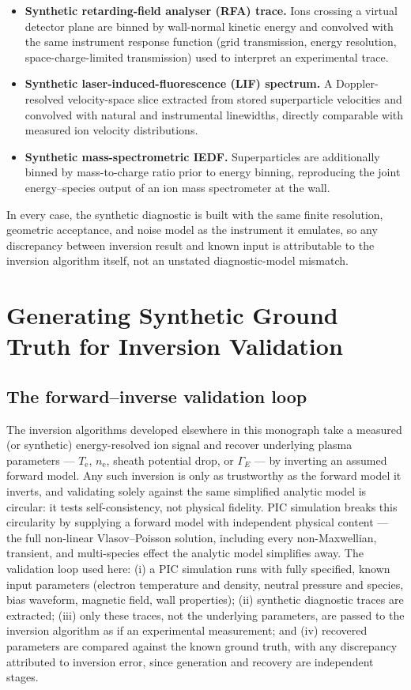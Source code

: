 \begin{itemize}
\item \textbf{Synthetic retarding-field analyser (RFA) trace.} Ions crossing a virtual detector plane are binned by wall-normal kinetic energy and convolved with the same instrument response function (grid transmission, energy resolution, space-charge-limited transmission) used to interpret an experimental trace.
\item \textbf{Synthetic laser-induced-fluorescence (LIF) spectrum.} A Doppler-resolved velocity-space slice extracted from stored superparticle velocities and convolved with natural and instrumental linewidths, directly comparable with measured ion velocity distributions.
\item \textbf{Synthetic mass-spectrometric IEDF.} Superparticles are additionally binned by mass-to-charge ratio prior to energy binning, reproducing the joint energy--species output of an ion mass spectrometer at the wall.
\end{itemize}
In every case, the synthetic diagnostic is built with the same finite resolution, geometric acceptance, and noise model as the instrument it emulates, so any discrepancy between inversion result and known input is attributable to the inversion algorithm itself, not an unstated diagnostic-model mismatch.

\section{Generating Synthetic Ground Truth for Inversion Validation}
\label{sec:synthetic_ground_truth}

\subsection{The forward--inverse validation loop}

The inversion algorithms developed elsewhere in this monograph take a measured (or synthetic) energy-resolved ion signal and recover underlying plasma parameters --- $T_{\mathrm{e}}$, $n_{\mathrm{e}}$, sheath potential drop, or $\Gamma_{E}$ --- by inverting an assumed forward model. Any such inversion is only as trustworthy as the forward model it inverts, and validating solely against the same simplified analytic model is circular: it tests self-consistency, not physical fidelity. PIC simulation breaks this circularity by supplying a forward model with independent physical content --- the full non-linear Vlasov--Poisson solution, including every non-Maxwellian, transient, and multi-species effect the analytic model simplifies away. The validation loop used here: (i) a PIC simulation runs with fully specified, known input parameters (electron temperature and density, neutral pressure and species, bias waveform, magnetic field, wall properties); (ii) synthetic diagnostic traces are extracted; (iii) only these traces, not the underlying parameters, are passed to the inversion algorithm as if an experimental measurement; and (iv) recovered parameters are compared against the known ground truth, with any discrepancy attributed to inversion error, since generation and recovery are independent stages.

